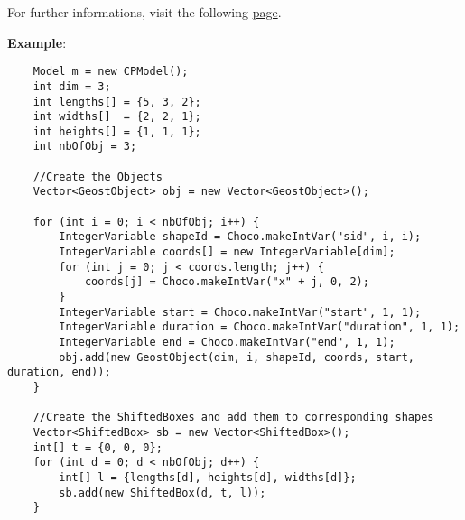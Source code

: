 \begin{notedef}
For further informations, visit the following \hyperlink{geostdescription:placementanduseofthegeostconstraint}{page}.
\end{notedef}

\textbf{Example}:
\begin{lstlisting}
	Model m = new CPModel();                                                                 
    int dim = 3;
	int lengths[] = {5, 3, 2};
	int widths[]  = {2, 2, 1};
	int heights[] = {1, 1, 1};
	int nbOfObj = 3;          
	                                                                        
	//Create the Objects                                                                         
	Vector<GeostObject> obj = new Vector<GeostObject>();                                    
	                                                                                         
	for (int i = 0; i < nbOfObj; i++) {                                                      
	    IntegerVariable shapeId = Choco.makeIntVar("sid", i, i);                             
	    IntegerVariable coords[] = new IntegerVariable[dim];                            
	    for (int j = 0; j < coords.length; j++) {                                            
	        coords[j] = Choco.makeIntVar("x" + j, 0, 2);                                     
	    }                                                                                    
	    IntegerVariable start = Choco.makeIntVar("start", 1, 1);                             
	    IntegerVariable duration = Choco.makeIntVar("duration", 1, 1);                       
	    IntegerVariable end = Choco.makeIntVar("end", 1, 1);                                 
	    obj.add(new GeostObject(dim, i, shapeId, coords, start, duration, end));            
	}                                                                                        
	                                                                                         
	//Create the ShiftedBoxes and add them to corresponding shapes                               
	Vector<ShiftedBox> sb = new Vector<ShiftedBox>();                                       
    int[] t = {0, 0, 0};                                                                 
	for (int d = 0; d < nbOfObj; d++) {                                                                    
	    int[] l = {lengths[d], heights[d], widths[d]};                                       
	    sb.add(new ShiftedBox(d, t, l));                                                    
	}                                                                                        
	                                                                                         

\end{lstlisting}
